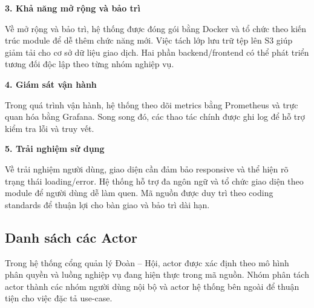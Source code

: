 \textbf{3. Khả năng mở rộng và bảo trì}\par
Về mở rộng và bảo trì, hệ thống được đóng gói bằng Docker và tổ chức theo kiến trúc module để dễ thêm chức năng mới. Việc tách lớp lưu trữ tệp lên S3 giúp giảm tải cho cơ sở dữ liệu giao dịch. Hai phần backend/frontend có thể phát triển tương đối độc lập theo từng nhóm nghiệp vụ.

\textbf{4. Giám sát vận hành}\par
Trong quá trình vận hành, hệ thống theo dõi metrics bằng Prometheus và trực quan hóa bằng Grafana. Song song đó, các thao tác chính được ghi log để hỗ trợ kiểm tra lỗi và truy vết.

\textbf{5. Trải nghiệm sử dụng}\par
Về trải nghiệm người dùng, giao diện cần đảm bảo responsive và thể hiện rõ trạng thái loading/error. Hệ thống hỗ trợ đa ngôn ngữ và tổ chức giao diện theo module để người dùng dễ làm quen. Mã nguồn được duy trì theo coding standards để thuận lợi cho bàn giao và bảo trì dài hạn.

\subsection{Danh sách các Actor}
Trong hệ thống cổng quản lý Đoàn -- Hội, actor được xác định theo mô hình phân quyền và luồng nghiệp vụ đang hiện thực trong mã nguồn. Nhóm phân tách actor thành các nhóm người dùng nội bộ và actor hệ thống bên ngoài để thuận tiện cho việc đặc tả use-case.

